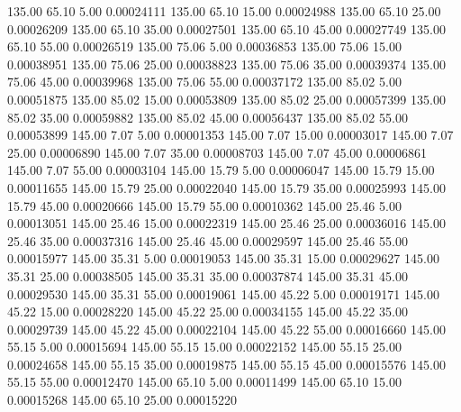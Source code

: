     135.00     65.10      5.00     0.00024111
    135.00     65.10     15.00     0.00024988
    135.00     65.10     25.00     0.00026209
    135.00     65.10     35.00     0.00027501
    135.00     65.10     45.00     0.00027749
    135.00     65.10     55.00     0.00026519
    135.00     75.06      5.00     0.00036853
    135.00     75.06     15.00     0.00038951
    135.00     75.06     25.00     0.00038823
    135.00     75.06     35.00     0.00039374
    135.00     75.06     45.00     0.00039968
    135.00     75.06     55.00     0.00037172
    135.00     85.02      5.00     0.00051875
    135.00     85.02     15.00     0.00053809
    135.00     85.02     25.00     0.00057399
    135.00     85.02     35.00     0.00059882
    135.00     85.02     45.00     0.00056437
    135.00     85.02     55.00     0.00053899
    145.00      7.07      5.00     0.00001353
    145.00      7.07     15.00     0.00003017
    145.00      7.07     25.00     0.00006890
    145.00      7.07     35.00     0.00008703
    145.00      7.07     45.00     0.00006861
    145.00      7.07     55.00     0.00003104
    145.00     15.79      5.00     0.00006047
    145.00     15.79     15.00     0.00011655
    145.00     15.79     25.00     0.00022040
    145.00     15.79     35.00     0.00025993
    145.00     15.79     45.00     0.00020666
    145.00     15.79     55.00     0.00010362
    145.00     25.46      5.00     0.00013051
    145.00     25.46     15.00     0.00022319
    145.00     25.46     25.00     0.00036016
    145.00     25.46     35.00     0.00037316
    145.00     25.46     45.00     0.00029597
    145.00     25.46     55.00     0.00015977
    145.00     35.31      5.00     0.00019053
    145.00     35.31     15.00     0.00029627
    145.00     35.31     25.00     0.00038505
    145.00     35.31     35.00     0.00037874
    145.00     35.31     45.00     0.00029530
    145.00     35.31     55.00     0.00019061
    145.00     45.22      5.00     0.00019171
    145.00     45.22     15.00     0.00028220
    145.00     45.22     25.00     0.00034155
    145.00     45.22     35.00     0.00029739
    145.00     45.22     45.00     0.00022104
    145.00     45.22     55.00     0.00016660
    145.00     55.15      5.00     0.00015694
    145.00     55.15     15.00     0.00022152
    145.00     55.15     25.00     0.00024658
    145.00     55.15     35.00     0.00019875
    145.00     55.15     45.00     0.00015576
    145.00     55.15     55.00     0.00012470
    145.00     65.10      5.00     0.00011499
    145.00     65.10     15.00     0.00015268
    145.00     65.10     25.00     0.00015220

